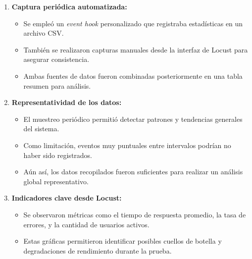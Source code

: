 \documentclass[10pt]{book}
\begin{document}
\begin{enumerate}
    \item \textbf{Captura periódica automatizada:}
    \begin{itemize}
        \item Se empleó un \textit{event hook} personalizado que registraba estadísticas en un archivo CSV.
        \item También se realizaron capturas manuales desde la interfaz de Locust para asegurar consistencia.
        \item Ambas fuentes de datos fueron combinadas posteriormente en una tabla resumen para análisis.
    \end{itemize}

    \item \textbf{Representatividad de los datos:}
    \begin{itemize}
        \item El muestreo periódico permitió detectar patrones y tendencias generales del sistema.
        \item Como limitación, eventos muy puntuales entre intervalos podrían no haber sido registrados.
        \item Aún así, los datos recopilados fueron suficientes para realizar un análisis global representativo.
    \end{itemize}

    \item \textbf{Indicadores clave desde Locust:}
    \begin{itemize}
        \item Se observaron métricas como el tiempo de respuesta promedio, la tasa de errores, y la cantidad de usuarios activos.
        \item Estas gráficas permitieron identificar posibles cuellos de botella y degradaciones de rendimiento durante la prueba.
    \end{itemize}


\end{enumerate}
\end{document}
